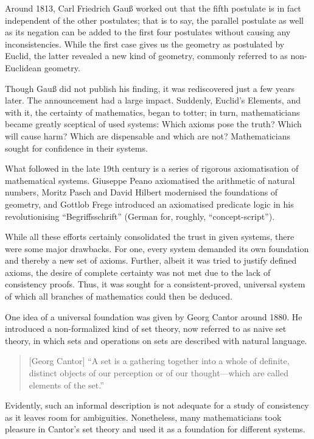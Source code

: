 \documentclass[hidelinks]{article}
\begin{document}
Around 1813, Carl Friedrich Gauß worked out that the fifth postulate is in fact independent of the other postulates; that is to say, the parallel postulate as well as its negation can be added to the first four postulates without causing any inconsistencies. While the first case gives us the geometry as postulated by Euclid, the latter revealed a new kind of geometry, commonly referred to as non-Euclidean geometry.

Though Gauß did not publish his finding, it was rediscovered just a few years later. The announcement had a large impact. Suddenly, Euclid's Elements, and with it, the certainty of mathematics, began to totter; in turn, mathematicians became greatly sceptical of used systems: Which axioms pose the truth? Which will cause harm? Which are dispensable and which are not? Mathematicians sought for confidence in their systems.

What followed in the late 19th century is a series of rigorous axiomatisation of mathematical systems. Giuseppe Peano axiomatised the arithmetic of natural numbers, Moritz Pasch and David Hilbert modernised the foundations of geometry, and Gottlob Frege introduced an axiomatised predicate logic in his revolutionising ``Begriffsschrift'' (German for, roughly, ``concept-script'').

While all these efforts certainly consolidated the trust in given systems, there were some major drawbacks. For one, every system demanded its own foundation and thereby a new set of axioms. Further, albeit it was tried to justify defined axioms, the desire of complete certainty was not met due to the lack of consistency proofs. Thus, it was sought for a consistent-proved, universal system of which all branches of mathematics could then be deduced.

One idea of a universal foundation was given by Georg Cantor around 1880. He introduced a non-formalized kind of set theory, now referred to as naive set theory, in which sets and operations on sets are described with natural language. 

\begin{quote}[Georg Cantor]
``A set is a gathering together into a whole of definite, distinct objects of our perception or of our thought—which are called elements of the set.''\cite{cantor_set}
\end{quote}

Evidently, such an informal description is not adequate for a study of consistency as it leaves room for ambiguities. Nonetheless, many mathematicians took pleasure in Cantor's set theory and used it as a foundation for different systems.
\end{document}

